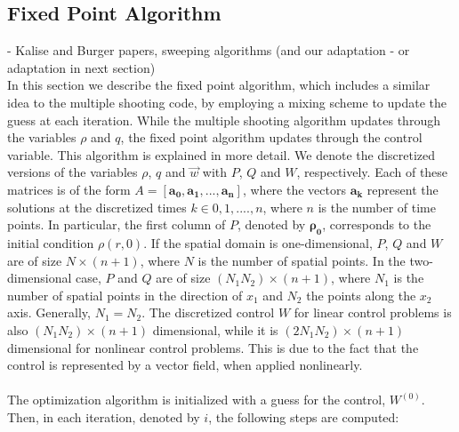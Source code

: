 \documentclass[11pt, a4paper]{article}
\theoremstyle{definition}
\newcommand{\adj}{q}
\begin{document}
\subsection{Fixed Point Algorithm}
- Kalise and Burger papers, sweeping algorithms (and our adaptation - or adaptation in next section)\\

In this section we describe the fixed point algorithm, which includes a similar idea to the multiple shooting code, by employing a mixing scheme to update the guess at each iteration. While the multiple shooting algorithm updates through the variables $\rho$ and $q$, the fixed point algorithm updates through the control variable. This algorithm is explained in more detail.
We denote the discretized versions of the variables $\rho$, $\adj$ and $\vec{w}$ with $P$, $Q$ and $W$, respectively. Each of these matrices is of the form $A = [\boldsymbol{a_0}, \boldsymbol{a_1}, ... ,\boldsymbol{a_n}]$, where the vectors $\boldsymbol{a_k}$ represent the solutions at the discretized times $k \in 0,1,....,n$, where $n$ is the number of time points. In particular, the first column of $P$, denoted by $\boldsymbol{\rho_0}$, corresponds to the initial condition $\rho(r,0)$. If the spatial domain is one-dimensional, $P$, $Q$ and $W$ are of size $N \times (n + 1)$, where $N$ is the number of spatial points. In the two-dimensional case, $P$ and $Q$ are of size $(N_1N_2) \times (n + 1)$, where $N_1$ is the number of spatial points in the direction of $x_1$ and $N_2$ the points along the $x_2$ axis. Generally, $N_1 = N_2$. The discretized control $W$ for linear control problems is also $(N_1N_2) \times (n + 1)$ dimensional, while it is $(2N_1N_2) \times (n + 1)$ dimensional for nonlinear control problems. This is due to the fact that the control is represented by a vector field, when applied nonlinearly.
\\
\\
The optimization algorithm is initialized with a guess for the control, $W^{(0)}$. Then, in each iteration, denoted by $i$, the following steps are computed:
\vspace{0.1cm}
\end{document}
